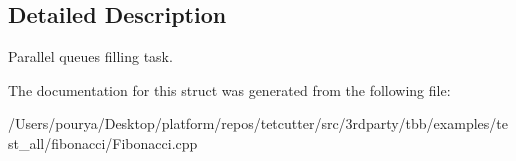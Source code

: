 \subsection{Detailed Description}
Parallel queue\textquotesingle{}s filling task. 

The documentation for this struct was generated from the following file\+:\begin{DoxyCompactItemize}
\item 
/\+Users/pourya/\+Desktop/platform/repos/tetcutter/src/3rdparty/tbb/examples/test\+\_\+all/fibonacci/Fibonacci.\+cpp\end{DoxyCompactItemize}

